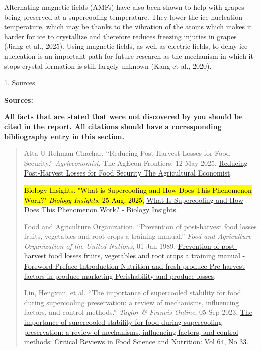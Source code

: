Alternating magnetic fields (AMFs) have also been shown to help with
grapes being preserved at a supercooling temperature. They lower the ice
nucleation temperature, which may be thanks to the vibration of the
atoms which makes it harder for ice to crystallize and therefore reduces
freezing injuries in grapes (Jiang et al., 2025). Using magnetic fields,
as well as electric fields, to delay ice nucleation is an important path
for future research as the mechanism in which it stops crystal formation
is still largely unknown (Kang et al., 2020).

1. Sources

\textbf{Sources:\\
}

\textbf{All facts that are stated that were not discovered by you should
be cited in the report. All citations should have a corresponding
bibliography entry in this section.}

\begin{quote}
Atta U Rehman Chachar. ``Reducing Post-Harvest Losses for Food
Security.'' \emph{Agrieconomist}, The AgEcon Frontiers, 12 May 2025,
\href{https://www.agrieconomist.com/reducing-post-harvest-losses-for-food-security}{\ul{Reducing
Post-Harvest Losses for Food Security \textbar{} The Agricultural
Economist}}.

\hl{Biology Insights. "What is Supercooling and How Does This Phenomenon
Work?" \emph{Biology Insights}, 25 Aug. 2025,}
\href{https://biologyinsights.com/what-is-supercooling-and-how-does-this-phenomenon-work/}{\ul{What
Is Supercooling and How Does This Phenomenon Work? - Biology Insights}}.

Food and Agriculture Organization. ``Prevention of post-harvest food
losses fruits, vegetables and root crops a training manual.'' \emph{Food
and Agriculture Organization of the United Nations}, 01 Jan 1989,
\href{https://www.fao.org/4/T0073E/T0073E01.htm}{\ul{Prevention of
post-harvest food losses fruits, vegetables and root crops a training
manual - Foreword-Preface-Introduction-Nutrition and fresh
produce-Pre-harvest factors in produce marketing-Perishability and
produce losses}}.

Lin, Hengxun, et al. ``The importance of supercooled stability for food
during supercooling preservation: a review of mechanisms, influencing
factors, and control methods.'' \emph{Taylor \& Francis Online}, 05 Sep
2023,
\href{https://www.tandfonline.com/doi/abs/10.1080/10408398.2023.2248515}{\ul{The
importance of supercooled stability for food during supercooling
preservation: a review of mechanisms, influencing factors, and control
methods: Critical Reviews in Food Science and Nutrition: Vol 64, No
33}}.
\end{quote}

